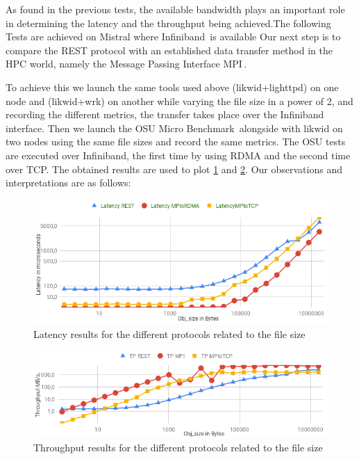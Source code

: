 \documentclass[runningheads]{llncs}
\begin{document}
As found in the previous tests, the available bandwidth plays an important role in determining the latency and the throughput being achieved.The following Tests are achieved on Mistral where Infiniband\,\cite{Infiniband} is available
Our next step is to compare the REST protocol with an established data transfer method in the HPC world, namely the Message Passing Interface MPI\,\cite{MPI}.

To achieve this we launch the same tools used above (likwid+lighttpd) on one node and (likwid+wrk) on another while varying the file size in a power of 2, and recording the different metrics, the transfer takes place over the Infiniband interface.
Then we launch the OSU Micro Benchmark\,\cite{osumicrobenchmark} alongside with likwid on two nodes using the same file sizes and record the same metrics. The OSU tests are executed over Infiniband, the first time by using RDMA and the second time over TCP.
The obtained results are used to plot \cref{fig:latency-rest-mpi} and \cref{fig:throughput-rest-mpi}. Our observations and interpretations are as follows:
\begin{figure}
\includegraphics[width=\textwidth]{latency-rest-mpi.png}
\caption{Latency results for the different protocols related to the file size} \label{fig:latency-rest-mpi}
\end{figure}
\begin{figure}
\includegraphics[width=\textwidth]{throughput-rest-mpi.png}
\caption{Throughput results for the different protocols related to the file size} \label{fig:throughput-rest-mpi}
\end{figure}
\end{document}
